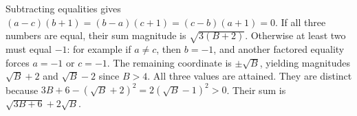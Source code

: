 Subtracting equalities gives $(a-c)(b+1)=(b-a)(c+1)=(c-b)(a+1)=0$. If all three numbers are equal, their sum magnitude is $\sqrt{3(B+2)}$. Otherwise at least two must equal $-1$: for example if $a\ne c$, then $b=-1$, and another factored equality forces $a=-1$ or $c=-1$. The remaining coordinate is $\pm\sqrt B$, yielding magnitudes $\sqrt B+2$ and $\sqrt B-2$ since $B>4$. All three values are attained. They are distinct because $3B+6-(\sqrt B+2)^2=2(\sqrt B-1)^2>0$. Their sum is $\boxed{\sqrt{3B+6}+2\sqrt B}$.
